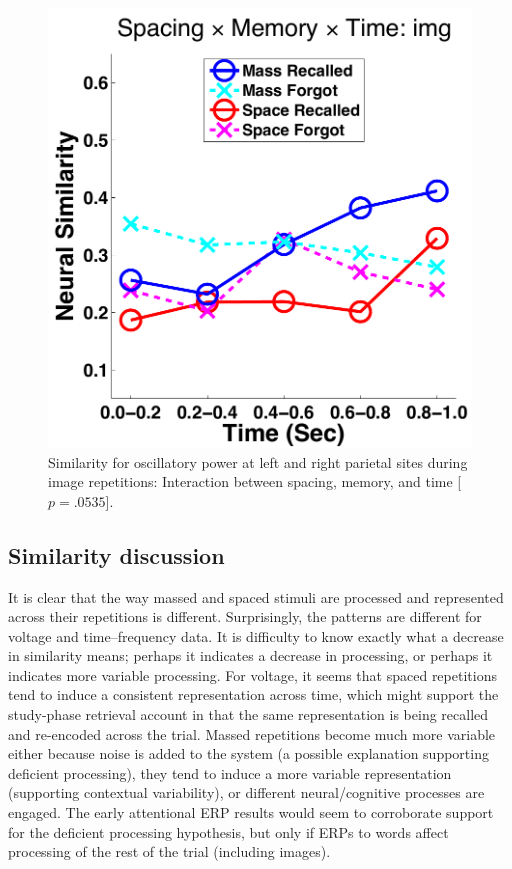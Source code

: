 \begin{figure}
  \centering
  \includegraphics[width=.40\textwidth]{./figs/exp1/similarity_spacXmemXtime_img_pow_LPSRPS_0to200_200to400_400to600_600to800_800to1000_kaiser_cosine}
  \caption{Similarity for oscillatory power at left and right parietal sites during image repetitions: Interaction between spacing, memory, and time [$p=.0535$].}
  \label{fig:sim_pow_spacXmemXtime}
\end{figure}

\subsection{Similarity discussion}

It is clear that the way massed and spaced stimuli are processed and represented across their repetitions is different.  Surprisingly, the patterns are different for voltage and time--frequency data.  It is difficulty to know exactly what a decrease in similarity means; perhaps it indicates a decrease in processing, or perhaps it indicates more variable processing.  For voltage, it seems that spaced repetitions tend to induce a consistent representation across time, \cbstart which might support the study-phase retrieval account in that the same representation is being recalled and re-encoded across the trial. \cbend  Massed repetitions become much more variable either because noise is added to the system (a possible explanation supporting deficient processing), they tend to induce a more variable representation (supporting contextual variability), or different neural/cognitive processes are engaged.
The early attentional ERP results would seem to corroborate support for the deficient processing hypothesis, but only if ERPs to words affect processing of the rest of the trial (including images).

